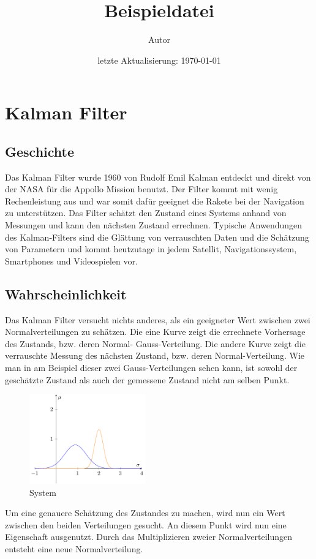 \documentclass[11pt,a4paper]{article}
\title{\bf {Beispieldatei}}
\author{\vspace{2cm}
  Autor}
\date{\vspace{3cm} %
      letzte Aktualisierung: \today}
\begin{document}
\section{Kalman Filter}
\subsection{Geschichte}
Das Kalman Filter wurde 1960 von Rudolf Emil Kalman entdeckt und direkt von der NASA für die Appollo Mission benutzt. Der Filter kommt mit wenig Rechenleistung aus und war somit dafür geeignet die Rakete bei der Navigation zu unterstützen. Das Filter schätzt den Zustand eines Systems anhand von Messungen und kann den nächsten Zustand errechnen. Typische Anwendungen des Kalman-Filters sind die Glättung von verrauschten Daten und die Schätzung von Parametern und kommt heutzutage in jedem Satellit, Navigationssystem, Smartphones und Videospielen vor.

\subsection{Wahrscheinlichkeit}
Das Kalman Filter versucht nichts anderes, als ein geeigneter Wert zwischen zwei Normalverteilungen zu schätzen. Die eine Kurve zeigt die errechnete Vorhersage des Zustands, bzw. deren Normal- Gauss-Verteilung. Die andere Kurve zeigt die verrauschte Messung des nächsten Zustand, bzw. deren Normal-Verteilung. Wie man in am Beispiel dieser zwei Gauss-Verteilungen sehen kann, ist sowohl der geschätzte Zustand als auch der gemessene Zustand nicht am selben Punkt. 



\begin{figure}
 \begin{center}
 \includegraphics[width=5cm]{papers/erdbeben/Gausskurve2.pdf}
 \caption{System}
 \end{center}
\end{figure}



Um eine genauere Schätzung des Zustandes zu machen, wird nun ein Wert zwischen den beiden Verteilungen gesucht. An diesem Punkt wird nun eine Eigenschaft ausgenutzt. Durch das Multiplizieren zweier Normalverteilungen entsteht eine neue Normalverteilung. 
\end{document}

